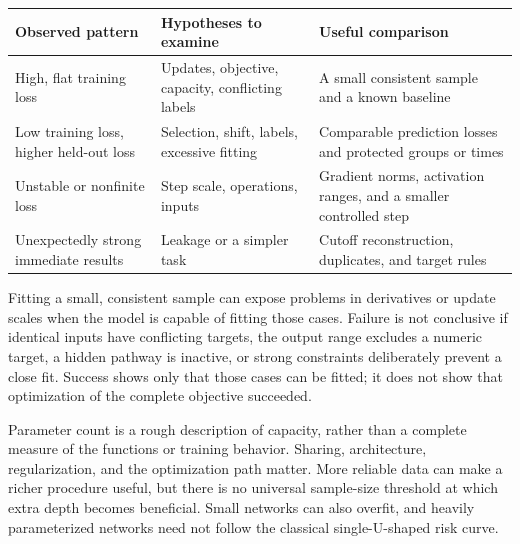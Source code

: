 \par\addvspace{\intextsep}\noindent\begin{minipage}{\linewidth}
\centering\small
\begin{tabular}{@{}L{3.0cm}L{3.2cm}L{3.3cm}@{}}
\toprule
Observed pattern & Hypotheses to examine & Useful comparison \\
\midrule
High, flat training loss & Updates, objective, capacity, conflicting labels & A small consistent sample and a known baseline \\
Low training loss, higher held-out loss & Selection, shift, labels, excessive fitting & Comparable prediction losses and protected groups or times \\
Unstable or nonfinite loss & Step scale, operations, inputs & Gradient norms, activation ranges, and a smaller controlled step \\
Unexpectedly strong immediate results & Leakage or a simpler task & Cutoff reconstruction, duplicates, and target rules \\
\bottomrule
\end{tabular}
\label{tab:opt-vs-gen-failure}
\label{tab:neural-debugging-patterns}
\end{minipage}\par\addvspace{\intextsep}

Fitting a small, consistent sample can expose problems in derivatives or update scales when the model is capable of fitting those cases. Failure is not conclusive if identical inputs have conflicting targets, the output range excludes a numeric target, a hidden pathway is inactive, or strong constraints deliberately prevent a close fit. Success shows only that those cases can be fitted; it does not show that optimization of the complete objective succeeded.

Parameter count is a rough description of capacity, rather than a complete measure of the functions or training behavior. Sharing, architecture, regularization, and the optimization path matter. More reliable data can make a richer procedure useful, but there is no universal sample-size threshold at which extra depth becomes beneficial. Small networks can also overfit, and heavily parameterized networks need not follow the classical single-U-shaped risk curve.

